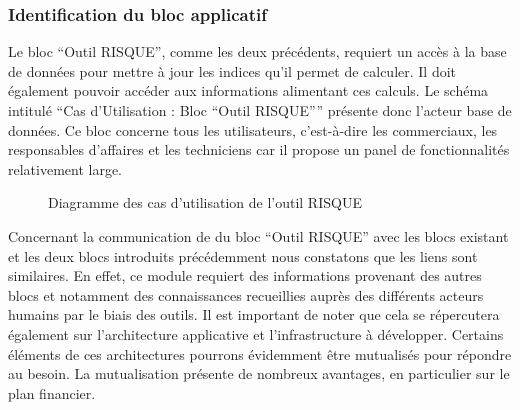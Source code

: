 \subsubsection{Identification du bloc applicatif}

Le bloc “Outil RISQUE”, comme les deux précédents, requiert un accès à la base de données pour mettre à jour les indices qu’il permet de calculer. Il doit également pouvoir accéder aux informations alimentant ces calculs. Le schéma intitulé “Cas d’Utilisation : Bloc “Outil RISQUE”” présente donc l’acteur base de données. Ce bloc concerne tous les utilisateurs, c’est-à-dire les commerciaux, les responsables d’affaires et les techniciens car il propose un panel de fonctionnalités relativement large.

\begin{figure}[H]
    \label{fig-uc-risque}
    \noindent{}
    \caption{Diagramme des cas d'utilisation de l'outil RISQUE}
\end{figure}

Concernant la communication de du bloc “Outil RISQUE” avec les blocs existant et les deux blocs introduits précédemment nous constatons que les liens sont similaires. En effet, ce module requiert des informations provenant des autres blocs et notamment des connaissances recueillies auprès des différents acteurs humains par le biais des outils. Il est important de noter que cela se répercutera également sur l’architecture applicative et l’infrastructure à développer. Certains éléments de ces architectures pourrons évidemment être mutualisés pour répondre au besoin. La mutualisation présente de nombreux avantages, en particulier sur le plan financier.

